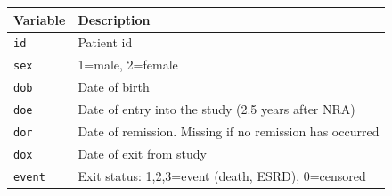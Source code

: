 \documentclass[
]{book}
\newcounter{none} %
\begin{document}
{\def\LTcaptype{none} %
\begin{longtable}[]{@{}ll@{}}
\toprule\noalign{}
Variable & Description \\
\midrule\noalign{}
\endhead
\bottomrule\noalign{}
\endlastfoot
\texttt{id} & Patient id \\
\texttt{sex} & 1=male, 2=female \\
\texttt{dob} & Date of birth \\
\texttt{doe} & Date of entry into the study (2.5 years after NRA) \\
\texttt{dor} & Date of remission. Missing if no remission has occurred \\
\texttt{dox} & Date of exit from study \\
\texttt{event} & Exit status: 1,2,3=event (death, ESRD), 0=censored \\
\end{longtable}
}
\end{document}
